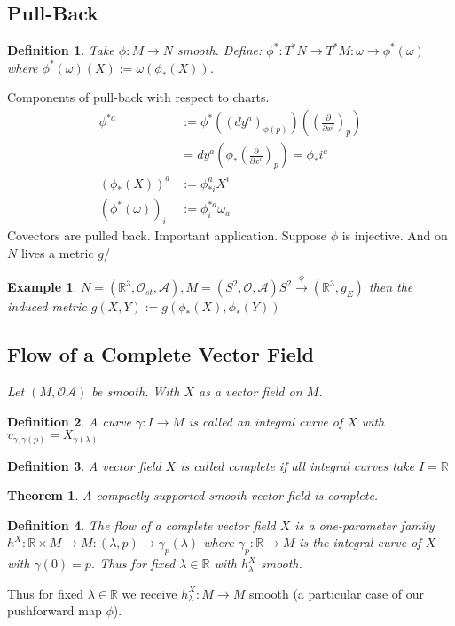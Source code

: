 \documentclass[10pt, oneside]{article}
\newcommand{\R}{\mathbb{R}}
\newtheorem{thm}{Theorem}
\newtheorem{defn}{Definition}
\newtheorem{example}{Example}
\begin{document}
\subsection{Pull-Back}
\begin{defn}
Take $\phi: M \to N$ smooth. Define: $\phi^*: T^*N \to T^* M: \omega \to \phi^*(\omega)$ where $\phi^*(\omega)(X):= \omega(\phi_*(X))$.
\end{defn}
Components of pull-back with respect to charts.
\begin{align*}
  \phi^{*a}&:=\phi^*((dy^a)_{\phi(p)})((\frac{\partial}{\partial x^i})_p) \\
  &= dy^a(\phi_*(\frac{\partial}{\partial x^i})_p) = \phi_*i^a \\
  (\phi_*(X))^a &:= \phi_{*i}^a X^i \\
  (\phi^*(\omega))_i &:= \phi^{*a}_i \omega_a
\end{align*}
Covectors are pulled back. Important application. Suppose $\phi$ is injective. And on $N$ lives a metric $g$/
\begin{example}
$N=(\R^3,\mathcal{O}_{st},\mathcal{A}), M=(S^2,\mathcal{O},\mathcal{A}) S^2 \xrightarrow{\phi}(\R^3,g_E)$ then the induced metric $g(X,Y):= g(\phi_*(X),\phi_*(Y))$
\subsection{Flow of a Complete Vector Field}
Let $(M,\mathcal{O}\mathcal{A})$ be smooth. With $X$ as a vector field on $M$.
\end{example}
\begin{defn}
A curve $\gamma: I \to M$ is called an integral curve of $X$ with $v_{\gamma,\gamma(p)} = X_{\gamma(\lambda)}$
\end{defn}
\begin{defn}
  A vector field $X$ is called complete if all integral curves take $I = \R$
\end{defn}
\begin{thm}
A compactly supported smooth vector field is complete.
\end{thm}
\begin{defn}
The flow of a complete vector field $X$ is a one-parameter family $h^X : \R \times M \to M: (\lambda,p) \to \gamma_p(\lambda)$ where $\gamma_p: \R \to M$ is the integral curve of $X$ with $\gamma(0) = p$. Thus for fixed $\lambda \in \R$ with $h^X_\lambda$ smooth.
\end{defn}
Thus for fixed $\lambda \in \R$ we receive $h^X_\lambda: M \to M$ smooth (a particular case of our pushforward map $\phi$).
\end{document}
